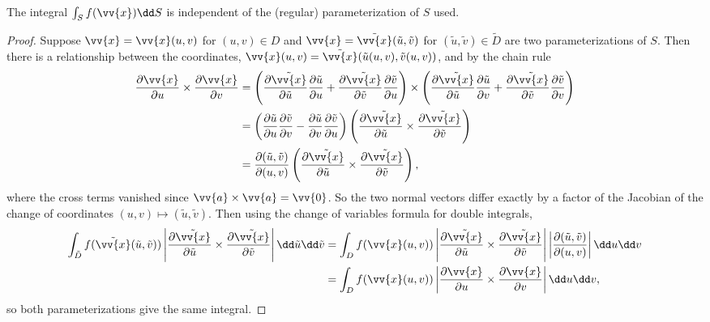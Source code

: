 \begin{proposition}
	The integral $\int_S f(\vv{x}) \dd S$ is independent of the (regular) parameterization of $S$ used.
\end{proposition}
\begin{proof}
	Suppose $\vv{x} = \vv{x}(u, v)$ for $(u, v) \in D$ and $\vv{x} = \tilde{\vv{x}}(\tilde{u}, \tilde{v})$ for $(\tilde{u}, \tilde{v}) \in \tilde{D}$ are two parameterizations of $S$. Then there is a relationship between the coordinates, $\vv{x}(u, v) = \tilde{\vv{x}}(\tilde{u}(u, v), \tilde{v}(u, v))$, and by the chain rule
	\begin{align*}
		\frac{\partial \vv{x}}{\partial u} \times \frac{\partial \vv{x}}{\partial v} &= \left(\frac{\partial \tilde{\vv{x}}}{\partial \tilde{u}}\frac{\partial \tilde{u}}{\partial u} + \frac{\partial \tilde{\vv{x}}}{\partial \tilde{v}}\frac{\partial \tilde{v}}{\partial u}\right) \times \left(\frac{\partial \tilde{\vv{x}}}{\partial \tilde{u}}\frac{\partial \tilde{u}}{\partial v} + \frac{\partial \tilde{\vv{x}}}{\partial \tilde{v}}\frac{\partial \tilde{v}}{\partial v}\right) \\
		&= \left(\frac{\partial \tilde{u}}{\partial u} \frac{\partial \tilde{v}}{\partial v} - \frac{\partial \tilde{u}}{\partial v} \frac{\partial \tilde{v}}{\partial u}\right) \left(\frac{\partial \tilde{\vv{x}}}{\partial \tilde{u}} \times \frac{\partial \tilde{\vv{x}}}{\partial \tilde{v}}\right) \\
		&= \frac{\partial(\tilde{u}, \tilde{v})}{\partial (u, v)} \left(\frac{\partial \tilde{\vv{x}}}{\partial \tilde{u}} \times \frac{\partial \tilde{\vv{x}}}{\partial \tilde{v}}\right),
	\end{align*}
	where the cross terms vanished since $\vv{a} \times \vv{a} = \vv{0}$. So the two normal vectors differ exactly by a factor of the Jacobian of the change of coordinates $(u, v) \mapsto (\tilde{u}, \tilde{v})$. Then using the change of variables formula for double integrals,
	\begin{align*}
		\int_{\tilde{D}} f(\tilde{\vv{x}}(\tilde{u}, \tilde{v})) \left|\frac{\partial \tilde{\vv{x}}}{\partial \tilde{u}} \times \frac{\partial \tilde{\vv{x}}}{\partial \tilde{v}}\right| \dd \tilde{u} \dd \tilde{v}
		&= \int_{D} f(\vv{x}(u, v)) \left|\frac{\partial \tilde{\vv{x}}}{\partial \tilde{u}} \times \frac{\partial \tilde{\vv{x}}}{\partial \tilde{v}}\right| \left|\frac{\partial(\tilde{u}, \tilde{v})}{\partial(u, v)}\right| \dd u \dd v \\
		&= \int_D f(\vv{x}(u, v)) \left|\frac{\partial \vv{x}}{\partial u} \times \frac{\partial \vv{x}}{\partial v}\right| \dd u \dd v,
	\end{align*}
	so both parameterizations give the same integral.
\end{proof}

